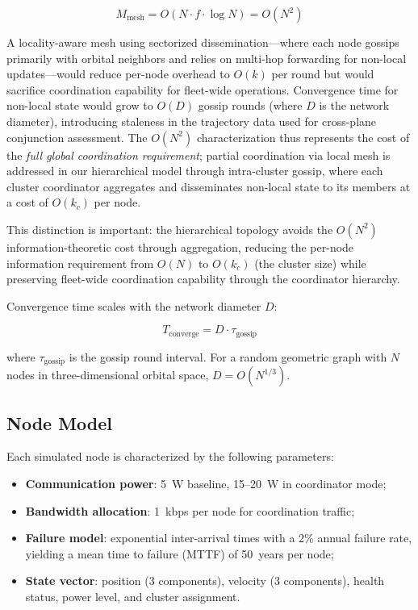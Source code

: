 \documentclass[journal]{IEEEtran}
\begin{document}
\begin{equation}
    M_{\text{mesh}} = O(N \cdot f \cdot \log N) = O(N^2)
    \label{eq:mesh_messages}
\end{equation}

A locality-aware mesh using sectorized dissemination---where each node gossips primarily with orbital neighbors and relies on multi-hop forwarding for non-local updates---would reduce per-node overhead to $O(k)$ per round but would sacrifice coordination capability for fleet-wide operations. Convergence time for non-local state would grow to $O(D)$ gossip rounds (where $D$ is the network diameter), introducing staleness in the trajectory data used for cross-plane conjunction assessment. The $O(N^2)$ characterization thus represents the cost of the \emph{full global coordination requirement}; partial coordination via local mesh is addressed in our hierarchical model through intra-cluster gossip, where each cluster coordinator aggregates and disseminates non-local state to its members at a cost of $O(k_c)$ per node.

This distinction is important: the hierarchical topology avoids the $O(N^2)$ information-theoretic cost through aggregation, reducing the per-node information requirement from $O(N)$ to $O(k_c)$ (the cluster size) while preserving fleet-wide coordination capability through the coordinator hierarchy.

Convergence time scales with the network diameter $D$:

\begin{equation}
    T_{\text{converge}} = D \cdot \tau_{\text{gossip}}
    \label{eq:mesh_convergence}
\end{equation}

\noindent where $\tau_{\text{gossip}}$ is the gossip round interval. For a random geometric graph with $N$ nodes in three-dimensional orbital space, $D = O(N^{1/3})$.

\subsection{Node Model}

Each simulated node is characterized by the following parameters:

\begin{itemize}
    \item \textbf{Communication power}: 5~W baseline, 15--20~W in coordinator mode;
    \item \textbf{Bandwidth allocation}: 1~kbps per node for coordination traffic;
    \item \textbf{Failure model}: exponential inter-arrival times with a 2\% annual failure rate, yielding a mean time to failure (MTTF) of 50~years per node;
    \item \textbf{State vector}: position (3 components), velocity (3 components), health status, power level, and cluster assignment.
\end{itemize}
\end{document}
